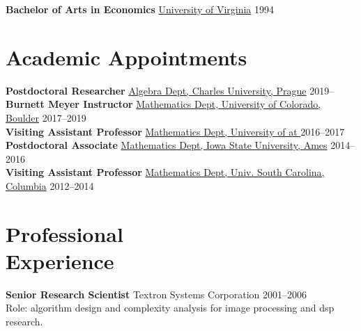 \documentclass[margin,line]{resume}
\begin{document}
\begin{resume}
    \vspace{-2mm}
    \textbf{Bachelor of Arts in Economics} \hfill \href{https://www.virginia.edu/}{University of Virginia} 1994

    \section{\mysidestyle Academic Appointments}
    \textbf{Postdoctoral Researcher} \hfill \href{https://ka.karlin.mff.cuni.cz/}{Algebra Dept, Charles University, Prague} 2019--\phantom{2019} \\[3pt]
    \textbf{Burnett Meyer Instructor} \hfill \href{https://www.colorado.edu/math/}{Mathematics Dept, University of Colorado, Boulder} 2017--2019 \\[3pt]
    \textbf{Visiting Assistant Professor} \hfill \href{https://math.hawaii.edu/wordpress/}{Mathematics Dept, University of \Hawaii at \Manoa} 2016--2017 \\[3pt]
    \textbf{Postdoctoral Associate} \hfill \href{https://math.iastate.edu/}{Mathematics Dept, Iowa State University, Ames}  2014--2016 \\[3pt]
    \textbf{Visiting Assistant Professor} \hfill \href{https://sc.edu/study/colleges_schools/artsandsciences/mathematics/index.php}{Mathematics Dept, Univ. South Carolina, Columbia} 2012--2014



    \section{\mysidestyle Professional\\Experience}
    
    \textbf{Senior Research Scientist} \hfill Textron Systems Corporation 2001--2006\\
    {\small Role: algorithm design and complexity analysis for image processing and dsp research.}


\end{resume}
\end{document}

